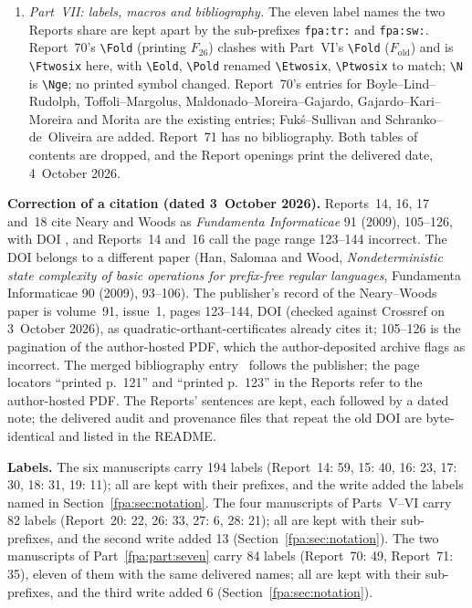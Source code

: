 \documentclass[11pt,a4paper]{article}
\numberwithin{equation}{section}
\newcommand{\N}{\mathbb N}\newcommand{\Z}{\mathbb Z}\newcommand{\R}{\mathbb R}
\newcommand{\Nge}{\mathbb Z_{\ge0}}\newcommand{\Nzero}{\mathbb N_0}
\newcommand{\Etwosix}{E_{26}}\newcommand{\Ptwosix}{P_{26}}\newcommand{\Ftwosix}{F_{26}}
\begin{document}
\begin{enumerate}
\item \emph{Part~VII: labels, macros and bibliography.} The eleven label names the two Reports share are kept apart by the sub-prefixes \texttt{fpa:tr:} and \texttt{fpa:sw:}. Report~70's \verb|\Fold| (printing $F_{26}$) clashes with Part~VI's \verb|\Fold| ($F_{\mathrm{old}}$) and is \verb|\Ftwosix| here, with \verb|\Eold|, \verb|\Pold| renamed \verb|\Etwosix|, \verb|\Ptwosix| to match; \verb|\N| is \verb|\Nge|; no printed symbol changed. Report~70's entries for Boyle--Lind--Rudolph, Toffoli--Margolus, Maldonado--Moreira--Gajardo, Gajardo--Kari--Moreira and Morita are the existing entries; Fuk\'s--Sullivan and Schranko--de~Oliveira are added. Report~71 has no bibliography. Both tables of contents are dropped, and the Report openings print the delivered date, 4~October 2026.
\end{enumerate}

\textbf{Correction of a citation (dated 3~October 2026).} Reports~14, 16, 17 and~18 cite Neary and Woods as \emph{Fundamenta Informaticae} 91 (2009), 105--126, with DOI , and Reports~14 and~16 call the page range 123--144 incorrect. The DOI  belongs to a different paper (Han, Salomaa and Wood, \emph{Nondeterministic state complexity of basic operations for prefix-free regular languages}, Fundamenta Informaticae 90 (2009), 93--106). The publisher's record of the Neary--Woods paper is volume~91, issue~1, pages 123--144, DOI  (checked against Crossref on 3~October 2026), as quadratic-orthant-certificates already cites it; 105--126 is the pagination of the author-hosted PDF, which the author-deposited archive flags as incorrect. The merged bibliography entry~\cite{fpa:nw} follows the publisher; the page locators ``printed p.~121'' and ``printed p.~123'' in the Reports refer to the author-hosted PDF. The Reports' sentences are kept, each followed by a dated note; the delivered audit and provenance files that repeat the old DOI are byte-identical and listed in the README.

\textbf{Labels.} The six manuscripts carry 194 labels (Report~14: 59, 15: 40, 16: 23, 17: 30, 18: 31, 19: 11); all are kept with their prefixes, and the write added the labels named in Section~\ref{fpa:sec:notation}. The four manuscripts of Parts~V--VI carry 82 labels (Report~20: 22, 26: 33, 27: 6, 28: 21); all are kept with their sub-prefixes, and the second write added 13 (Section~\ref{fpa:sec:notation}). The two manuscripts of Part~\ref{fpa:part:seven} carry 84 labels (Report~70: 49, Report~71: 35), eleven of them with the same delivered names; all are kept with their sub-prefixes, and the third write added 6 (Section~\ref{fpa:sec:notation}).
\end{document}
